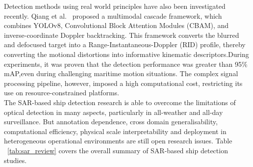 Detection methods using real world principles have also been investigated recently. Qiang et al.~\cite{rs18081166} proposed a multimodal cascade framework, which combines YOLOv8, Convolutional Block Attention Modules (CBAM), and inverse-coordinate Doppler backtracking. This framework converts the blurred and defocused target into a Range-Instantaneous-Doppler (RID) profile, thereby converting the motional distortions into informative kinematic descriptors.During experiments, it was proven that the detection performance was greater than 95\% mAP,even during challenging maritime motion situations. The complex signal processing pipeline, however, imposed a high computational cost, restricting its use on resource-constrained platforms.\\

The SAR-based ship detection research is able to overcome the limitations of optical detection in many aspects, particularly in all-weather and all-day surveillance. But annotation dependence, cross domain generalisability, computational efficiency, physical scale interpretability and deployment in heterogeneous operational environments are still open research issues. Table ~\ref{tab:sar_review} covers the overall summary of SAR-based ship detection studies.


